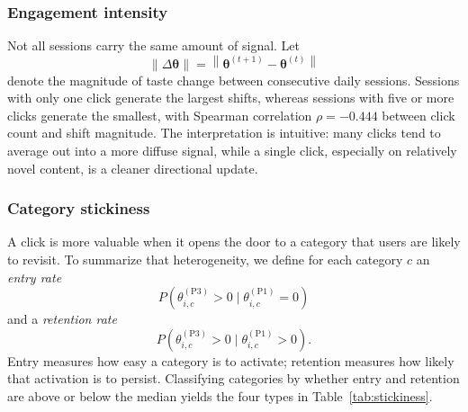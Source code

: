 \documentclass[11pt]{article}
\begin{document}
\subsubsection{Engagement intensity}

Not all sessions carry the same amount of signal. Let
\[
\|\Delta\boldsymbol{\theta}\|
=
\left\|
\boldsymbol{\theta}^{(t+1)}-\boldsymbol{\theta}^{(t)}
\right\|
\]
denote the magnitude of taste change between consecutive daily sessions. Sessions with only one click generate the largest shifts, whereas sessions with five or more clicks generate the smallest, with Spearman correlation $\rho=-0.444$ between click count and shift magnitude. The interpretation is intuitive: many clicks tend to average out into a more diffuse signal, while a single click, especially on relatively novel content, is a cleaner directional update.

\subsubsection{Category stickiness}

A click is more valuable when it opens the door to a category that users are likely to revisit. To summarize that heterogeneity, we define for each category $c$ an \emph{entry rate}
\[
P\!\left(\theta_{i,c}^{(\mathrm{P3})}>0 \mid \theta_{i,c}^{(\mathrm{P1})}=0\right)
\]
and a \emph{retention rate}
\[
P\!\left(\theta_{i,c}^{(\mathrm{P3})}>0 \mid \theta_{i,c}^{(\mathrm{P1})}>0\right).
\]
Entry measures how easy a category is to activate; retention measures how likely that activation is to persist. Classifying categories by whether entry and retention are above or below the median yields the four types in Table~\ref{tab:stickiness}.
\end{document}
